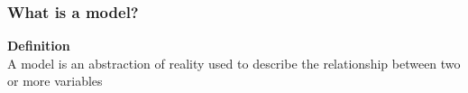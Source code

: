 \documentclass[color=usenames,dvipsnames]{beamer}\usepackage[]{graphicx}\usepackage[]{color}
\begin{document}
\begin{frame}
  \frametitle{What is a model?}
    {\bf Definition} \\
    A model is an abstraction of reality used to describe the
    relationship between two or more variables \par
    \vfill %
  \vfill
  \begin{columns}%
    \begin{column}{0.65\textwidth}
    \end{column}
    \begin{column}{0.15\textwidth}

\end{column}
\end{columns}
\end{frame}
\end{document}
